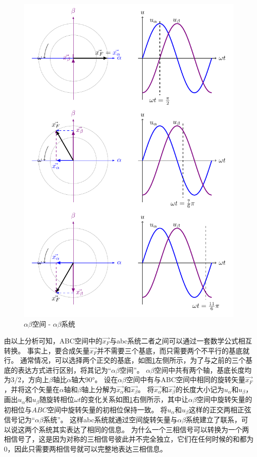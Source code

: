 \documentclass{ctexart}
\numberwithin{equation}{section}
\begin{document}
\begin{figure}[htb]
\begin{minipage}[b]{0.48\linewidth}
\includegraphics[width = \linewidth]{alpha-beta-space.pdf}
\caption{$\alpha \beta $空间 - $\alpha \beta $系统}
\label{alpha-beta-space}
\end{minipage}
\end{figure}

由以上分析可知，ABC空间中的$ \vec{x_F} $与abc系统二者之间可以通过一套数学公式相互转换。
事实上，要合成矢量$ \vec{x_F} $并不需要三个基底，而只需要两个不平行的基底就行。
通常情况，可以选择两个正交的基底，如图\ref{alpha-beta-space}左侧所示，为了与之前的三个基底的表达方式进行区别，将其记为“$\alpha \beta$空间”。
$\alpha \beta$空间中共有两个轴，基底长度均为3/2，方向上$ \beta $轴比$ \alpha $轴大\ang{90}。
设在$\alpha \beta$空间中有与ABC空间中相同的旋转矢量$ \vec{x_F} $，并将这个矢量在$ \alpha $轴和$ \beta $轴上分解为$\vec{x_{\alpha}}$和$\vec{x_{\beta}}$。
将$\vec{x_{\alpha}}$和$\vec{x_{\beta}}$的长度大小记为${u_{\alpha}}$和${u_{\beta}}$，画出${u_{\alpha}}$和${u_{\beta}}$随旋转相位$\omega t$的变化关系如图\ref{alpha-beta-space}右侧所示，其中让$\alpha \beta$空间中旋转矢量的初相位与$ABC$空间中旋转矢量的初相位保持一致。
将${u_{\alpha}}$和${u_{\beta}}$这样的正交两相正弦信号记为“$\alpha \beta$系统”。
这样abc系统就通过空间旋转矢量与$\alpha \beta$系统建立了联系，可以说这两个系统其实表达了相同的信息。
为什么一个三相信号可以转换为一个两相信号了，这是因为对称的三相信号彼此并不完全独立，它们在任何时候的和都为0，因此只需要两相信号就可以完整地表达三相信息。
\end{document}

